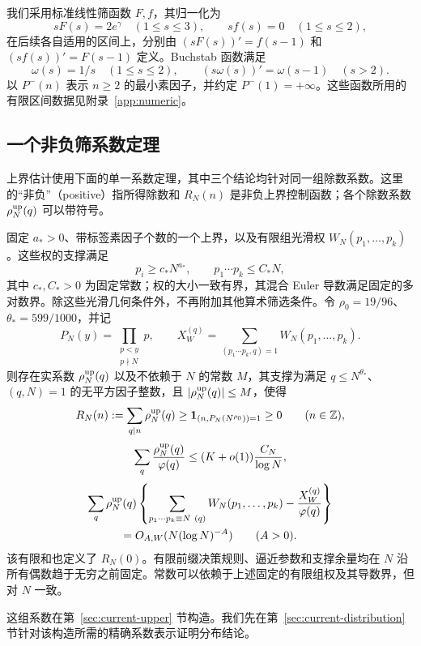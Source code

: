 我们采用标准线性筛函数 $F,f$，其归一化为
\[
 sF(s)=2e^\gamma\quad(1\le s\le3),\qquad
 sf(s)=0\quad(1\le s\le2),
\]
在后续各自适用的区间上，分别由 $(sF(s))'=f(s-1)$ 和 $(sf(s))'=F(s-1)$ 定义。Buchstab 函数满足
\[
 \omega(s)=1/s\quad(1\le s\le2),\qquad
 (s\omega(s))'=\omega(s-1)\quad(s>2).
\]
以 $P^-(n)$ 表示 $n\ge2$ 的最小素因子，并约定 $P^-(1)=+\infty$。这些函数所用的有限区间数据见附录~\ref{app:numeric}。

\subsection{一个非负筛系数定理}
上界估计使用下面的单一系数定理，其中三个结论均针对同一组除数系数。这里的“非负”（positive）指所得除数和 $R_N(n)$ 是非负上界控制函数；各个除数系数 $\rho_N^{\rm up}(q)$ 可以带符号。

\begin{theorem}
\label{thm:positive-coefficient}
固定 $a_*>0$、带标签素因子个数的一个上界，以及有限组光滑权 $W_N(p_1,\ldots,p_k)$。这些权的支撑满足
\[
 p_i\ge c_*N^{a_*},\qquad p_1\cdots p_k\le C_*N,
\]
其中 $c_*,C_*>0$ 为固定常数；权的大小一致有界，其混合 Euler 导数满足固定的多对数界。除这些光滑几何条件外，不再附加其他算术筛选条件。令 $\rho_0=19/96$、$\theta_*=599/1000$，并记
\[
 P_N(y)=\prod_{\substack{p<y\\p\nmid N}}p,\qquad
 X_W^{(q)}=\sum_{(p_1\cdots p_k,q)=1}W_N(p_1,\ldots,p_k).
\]
则存在实系数 $\rho_N^{\rm up}(q)$ 以及不依赖于 $N$ 的常数 $M$，其支撑为满足 $q\le N^{\theta_*}$、$(q,N)=1$ 的无平方因子整数，且 $|\rho_N^{\rm up}(q)|\le M$，使得
\begin{equation}
 R_N(n):=\sum_{q\mid n}\rho_N^{\rm up}(q)
   \ge\mathbf 1_{(n,P_N(N^{\rho_0}))=1}\ge0
                           \qquad(n\in\mathbb Z),\label{eq:core-positivity}
\end{equation}
\begin{equation}
 \sum_q\frac{\rho_N^{\rm up}(q)}{\varphi(q)}
   \le(K+o(1))\frac{C_N}{\log N},\label{eq:core-density}
\end{equation}
\begin{multline}
 \sum_q\rho_N^{\rm up}(q)\left\{
 \sum_{p_1\cdots p_k\equiv N\ (q)}W_N(p_1,\ldots,p_k)
       -\frac{X_W^{(q)}}{\varphi(q)}\right\}\\
   =O_{A,W}(N(\log N)^{-A})\qquad(A>0).
                           \label{eq:core-distribution}
\end{multline}
该有限和也定义了 $R_N(0)$。有限前缀决策规则、逼近参数和支撑余量均在 $N$ 沿所有偶数趋于无穷之前固定。常数可以依赖于上述固定的有限组权及其导数界，但对 $N$ 一致。
\end{theorem}

这组系数在第~\ref{sec:current-upper} 节构造。我们先在第~\ref{sec:current-distribution} 节针对该构造所需的精确系数表示证明分布结论。
